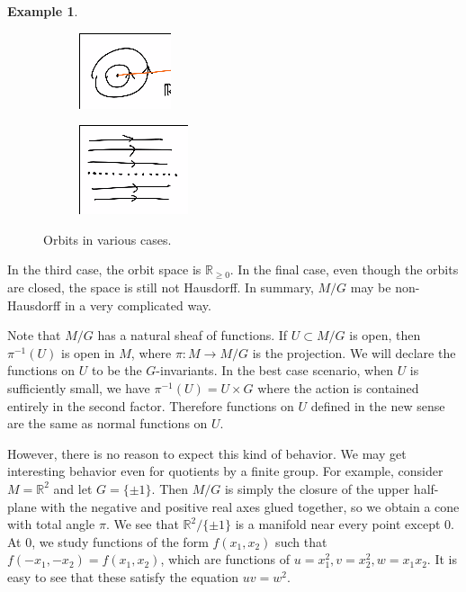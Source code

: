 \documentclass[leqno, openany]{memoir}
\theoremstyle{definition}
\newtheorem{exm}[thm]{Example}
\theoremstyle{remark}
\theoremstyle{plain}
\theoremstyle{definition}
\theoremstyle{remark}
\newcommand{\R}{\mathbb{R}}
\begin{document}
\begin{exm}
\begin{figure}[H]
\begin{subfigure}[b]{0.2\textwidth}
\begin{center}
        \end{center}
        \caption{}
        \label{fig:}
        \end{subfigure}
        \begin{subfigure}[b]{0.2\textwidth}
        \begin{center}
            \includegraphics[scale=0.6]{orbits3.png}
        \end{center}
        \caption{}
        \label{fig:}
        \end{subfigure}
        \begin{subfigure}[b]{0.2\textwidth}
        \begin{center}
            \includegraphics[scale=0.6]{orbits4.png}
        \end{center}
        \caption{}
        \label{fig:}
        \end{subfigure}
        \caption{Orbits in various cases.}%
        \label{fig:name}
    \end{figure}
    In the third case, the orbit space is $\R_{\geq 0}$. In the final case, even though the orbits are closed, the space is still not Hausdorff. In summary, $M/G$ may be non-Hausdorff in a very complicated way.
\end{exm}

Note that $M/G$ has a natural sheaf of functions. If $U \subset M/G$ is open, then $\pi^{-1}(U)$ is open in $M$, where $\pi: M \to M/G$ is the projection. We will declare the functions on $U$ to be the $G$-invariants. In the best case scenario, when $U$ is sufficiently small, we have $\pi^{-1}(U) = U \times G$ where the action is contained entirely in the second factor. Therefore functions on $U$ defined in the new sense are the same as normal functions on $U$.

However, there is no reason to expect this kind of behavior. We may get interesting behavior even for quotients by a finite group. For example, consider $M = \R^2$ and let $G = \{ \pm 1 \}$. Then $M / G$ is simply the closure of the upper half-plane with the negative and positive real axes glued together, so we obtain a cone with total angle $\pi$. We see that $\R^2 / \{ \pm 1 \}$ is a manifold near every point except $0$. At $0$, we study functions of the form $f(x_1,x_2)$ such that $f(-x_1,-x_2) = f(x_1,x_2)$, which are functions of $u = x_1^2, v = x_2^2, w = x_1x_2$. It is easy to see that these satisfy the equation $uv = w^2$.
\end{document}
